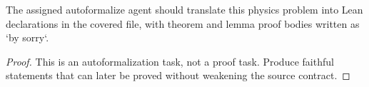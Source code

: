 \begin{theorem}
\label{thm:physics:IPhO_2026_4_A_1:target}
The assigned autoformalize agent should translate this physics problem into Lean declarations in the covered file, with theorem and lemma proof bodies written as `by sorry`.
\end{theorem}
\begin{proof}
This is an autoformalization task, not a proof task. Produce faithful statements that can later be proved without weakening the source contract.
\end{proof}


